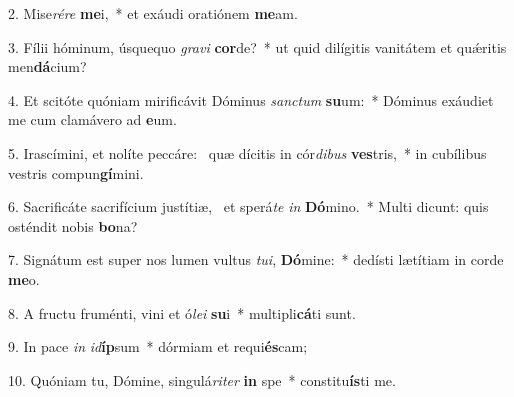 2. Mise\textit{ré}\textit{re} \textbf{me}i,~*  et exáudi oratiónem \textbf{me}am.\

3. Fílii hóminum, úsquequo \textit{gra}\textit{vi} \textbf{cor}de?~*  ut quid dilígitis vanitátem et quǽritis men\textbf{dá}cium?\

4. Et scitóte quóniam mirificávit Dóminus \textit{sanc}\textit{tum} \textbf{su}um:~*  Dóminus exáudiet me cum clamávero ad \textbf{e}um.\

5. Irascímini, et nolíte peccáre: \dag\  quæ dícitis in cór\textit{di}\textit{bus} \textbf{ves}tris,~*  in cubílibus vestris compun\textbf{gí}mini.\

6. Sacrificáte sacrifícium justítiæ, \dag\  et sperá\textit{te} \textit{in} \textbf{Dó}mino.~*  Multi dicunt: quis osténdit nobis \textbf{bo}na?\

7. Signátum est super nos lumen vultus \textit{tu}\textit{i}, \textbf{Dó}mine:~*  dedísti lætítiam in corde \textbf{me}o.\

8. A fructu fruménti, vini et ó\textit{le}\textit{i} \textbf{su}i~*  multipli\textbf{cá}ti sunt.\

9. In pace \textit{in} \textit{id}\textbf{íp}sum~*  dórmiam et requi\textbf{és}cam;\

10. Quóniam tu, Dómine, singulá\textit{ri}\textit{ter} \textbf{in} spe~*  constitu\textbf{ís}ti me.\

